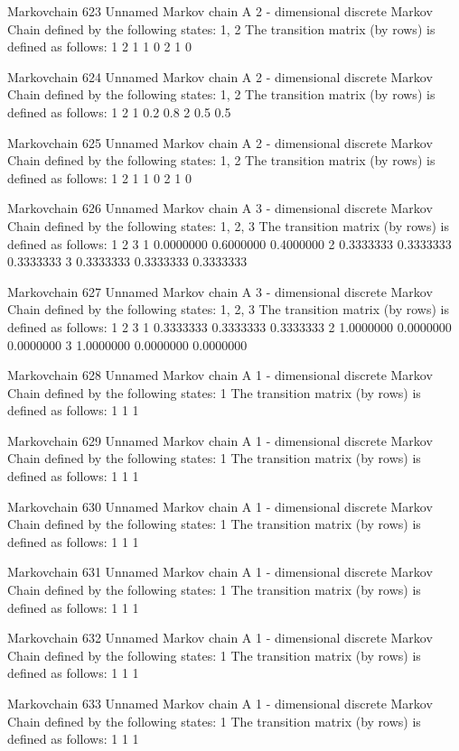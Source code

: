 \documentclass[
  nojss]{jss}
\begin{document}
\begin{CodeChunk}
\begin{CodeOutput}
Markovchain  623 
Unnamed Markov chain 
 A  2 - dimensional discrete Markov Chain defined by the following states: 
 1, 2 
 The transition matrix  (by rows)  is defined as follows: 
  1 2
1 1 0
2 1 0

Markovchain  624 
Unnamed Markov chain 
 A  2 - dimensional discrete Markov Chain defined by the following states: 
 1, 2 
 The transition matrix  (by rows)  is defined as follows: 
    1   2
1 0.2 0.8
2 0.5 0.5

Markovchain  625 
Unnamed Markov chain 
 A  2 - dimensional discrete Markov Chain defined by the following states: 
 1, 2 
 The transition matrix  (by rows)  is defined as follows: 
  1 2
1 1 0
2 1 0

Markovchain  626 
Unnamed Markov chain 
 A  3 - dimensional discrete Markov Chain defined by the following states: 
 1, 2, 3 
 The transition matrix  (by rows)  is defined as follows: 
          1         2         3
1 0.0000000 0.6000000 0.4000000
2 0.3333333 0.3333333 0.3333333
3 0.3333333 0.3333333 0.3333333

Markovchain  627 
Unnamed Markov chain 
 A  3 - dimensional discrete Markov Chain defined by the following states: 
 1, 2, 3 
 The transition matrix  (by rows)  is defined as follows: 
          1         2         3
1 0.3333333 0.3333333 0.3333333
2 1.0000000 0.0000000 0.0000000
3 1.0000000 0.0000000 0.0000000

Markovchain  628 
Unnamed Markov chain 
 A  1 - dimensional discrete Markov Chain defined by the following states: 
 1 
 The transition matrix  (by rows)  is defined as follows: 
  1
1 1

Markovchain  629 
Unnamed Markov chain 
 A  1 - dimensional discrete Markov Chain defined by the following states: 
 1 
 The transition matrix  (by rows)  is defined as follows: 
  1
1 1

Markovchain  630 
Unnamed Markov chain 
 A  1 - dimensional discrete Markov Chain defined by the following states: 
 1 
 The transition matrix  (by rows)  is defined as follows: 
  1
1 1

Markovchain  631 
Unnamed Markov chain 
 A  1 - dimensional discrete Markov Chain defined by the following states: 
 1 
 The transition matrix  (by rows)  is defined as follows: 
  1
1 1

Markovchain  632 
Unnamed Markov chain 
 A  1 - dimensional discrete Markov Chain defined by the following states: 
 1 
 The transition matrix  (by rows)  is defined as follows: 
  1
1 1

Markovchain  633 
Unnamed Markov chain 
 A  1 - dimensional discrete Markov Chain defined by the following states: 
 1 
 The transition matrix  (by rows)  is defined as follows: 
  1
1 1


\end{CodeOutput}
\end{CodeChunk}
\end{document}
